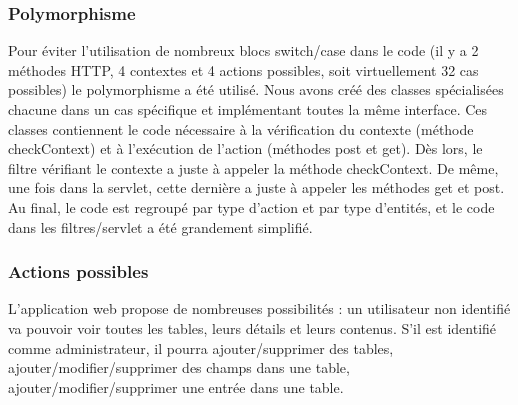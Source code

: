 \subsubsection{Polymorphisme}
Pour éviter l'utilisation de nombreux blocs switch/case dans le code (il y a 2 méthodes HTTP, 4 contextes et 4 actions possibles, soit virtuellement 32 cas possibles) le polymorphisme a été utilisé. 
Nous avons créé des classes spécialisées chacune dans un cas spécifique et implémentant toutes la même interface. 
Ces classes contiennent le code nécessaire à la vérification du contexte (méthode checkContext) et à l'exécution de l'action (méthodes post et get).
Dès lors, le filtre vérifiant le contexte a juste à appeler la méthode checkContext.
De même, une fois dans la servlet, cette dernière a juste à appeler les méthodes get et post.
Au final, le code est regroupé par type d'action et par type d'entités, et le code dans les filtres/servlet a été grandement simplifié.

\subsubsection{Actions possibles}
L'application web propose de nombreuses possibilités : un utilisateur non identifié va pouvoir voir toutes les tables, leurs détails et leurs contenus.
S'il est identifié comme administrateur, il pourra ajouter/supprimer des tables, ajouter/modifier/supprimer des champs dans une table, ajouter/modifier/supprimer une entrée dans une table.
